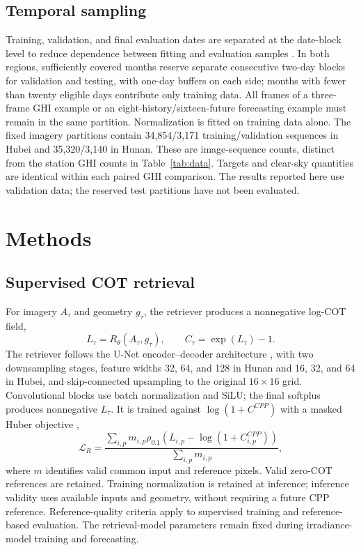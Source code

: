\documentclass[11pt]{article}
\begin{document}
\subsection{Temporal sampling}
Training, validation, and final evaluation dates are separated at the date-block level to reduce dependence between fitting and evaluation samples \cite{roberts2017}. In both regions, sufficiently covered months reserve separate consecutive two-day blocks for validation and testing, with one-day buffers on each side; months with fewer than twenty eligible days contribute only training data. All frames of a three-frame GHI example or an eight-history/sixteen-future forecasting example must remain in the same partition. Normalization is fitted on training data alone. The fixed imagery partitions contain 34,854/3,171 training/validation sequences in Hubei and 35,320/3,140 in Hunan. These are image-sequence counts, distinct from the station GHI counts in Table~\ref{tab:data}. Targets and clear-sky quantities are identical within each paired GHI comparison. The results reported here use validation data; the reserved test partitions have not been evaluated.

\section{Methods}
\subsection{Supervised COT retrieval}
For imagery $A_\tau$ and geometry $g_\tau$, the retriever produces a nonnegative log-COT field,
\begin{equation}
L_\tau=R_\theta(A_\tau,g_\tau),\qquad C_\tau=\exp(L_\tau)-1.
\label{eq:retrieval}
\end{equation}
The retriever follows the U-Net encoder--decoder architecture \cite{unet2015}, with two downsampling stages, feature widths 32, 64, and 128 in Hunan and 16, 32, and 64 in Hubei, and skip-connected upsampling to the original $16\times16$ grid. Convolutional blocks use batch normalization and SiLU; the final softplus produces nonnegative $L_\tau$. It is trained against $\log(1+C^{CPP})$ with a masked Huber objective \cite{huber1964},
\begin{equation}
\mathcal L_R=\frac{\sum_{i,p}m_{i,p}\rho_{0.1}\!\left(L_{i,p}-\log(1+C^{CPP}_{i,p})\right)}{\sum_{i,p}m_{i,p}},
\label{eq:retrieval-loss}
\end{equation}
where $m$ identifies valid common input and reference pixels. Valid zero-COT references are retained. Training normalization is retained at inference; inference validity uses available inputs and geometry, without requiring a future CPP reference. Reference-quality criteria apply to supervised training and reference-based evaluation. The retrieval-model parameters remain fixed during irradiance-model training and forecasting.
\end{document}
